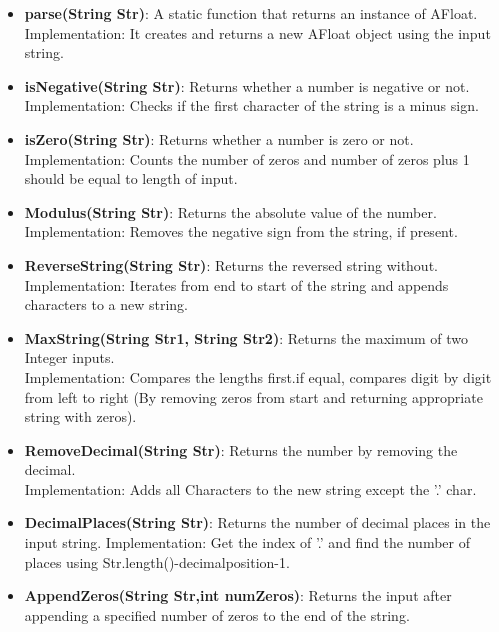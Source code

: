 \documentclass{article}
\begin{document}
\begin{itemize}
    \item \textbf{parse(String Str)}: A static function that returns an instance of AFloat. \\
    Implementation: It creates and returns a new AFloat object using the input string.

    \item \textbf{isNegative(String Str)}: Returns whether a number is negative or not. \\
    Implementation: Checks if the first character of the string is a minus sign.

    \item \textbf{isZero(String Str)}: Returns whether a number is zero or not.
    Implementation: Counts the number of zeros and number of zeros plus 1 should be equal to length of input.

    \item \textbf{Modulus(String Str)}: Returns the absolute value of the number. \\
    Implementation: Removes the negative sign from the string, if present.

    \item \textbf{ReverseString(String Str)}: Returns the reversed string without. \\
    Implementation: Iterates from end to start of the string and appends characters to a new string.

    \item \textbf{MaxString(String Str1, String Str2)}: Returns the maximum of two Integer inputs. \\
    Implementation: Compares the lengths first.if equal, compares digit by digit from left to right (By removing zeros from start and returning appropriate string with zeros).

    \item \textbf{RemoveDecimal(String Str)}: Returns the number by removing the decimal.\\
    Implementation: Adds all Characters to the new string except the '.' char.

    \item \textbf{DecimalPlaces(String Str)}: Returns the number of decimal places in the input string.
    Implementation: Get the index of '.' and find the number of places using Str.length()-decimalposition-1.

    \item \textbf{AppendZeros(String Str,int numZeros)}: Returns the input after appending a specified number of zeros to the end of the string.


\end{itemize}
\end{document}
